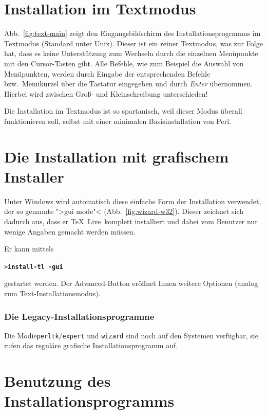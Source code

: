 \documentclass[12pt,ngerman,a4paper,fullparskip]{report}
\newcommand{\TL}{\TeX\ Live\xspace}
\newcommand{\Ucom}[1]{\textbf{\texttt{#1}}}
\begin{document}
\section{Installation im Textmodus}

Abb.~\ref{fig:text-main} zeigt den Eingangsbildschirm des Installationsprogramms im Textmodus (Standard unter Unix). Dieser ist ein reiner Textmodus, was zur Folge hat, dass es keine Unterstützung zum Wechseln durch die einzelnen Menüpunkte mit den Cursor-Tasten gibt. Alle Befehle, wie zum Beispiel die Auswahl von Menüpunkten, werden durch Eingabe der entsprechenden Befehle bzw.\ Menükürzel über die Tastatur eingegeben und durch \emph{Enter} übernommen. Hierbei wird zwischen Groß- und Kleinschreibung unterschieden!

Die Installation im Textmodus ist so spartanisch, weil dieser Modus überall funktionieren soll, selbst mit einer minimalen Basisinstallation von Perl.

\section{Die Installation mit grafischem Installer}

Unter Windows wird automatisch diese einfache Form der Installation verwendet,
der so genannte ">gui mode"< (Abb.~\ref{fig:wizard-w32}). Dieser zeichnet sich dadurch aus, dass er \TL\ komplett installiert und dabei vom Benutzer nur wenige Angaben gemacht werden müssen. 

Er kann mittels 

\begin{alltt}
> \Ucom{install-tl -gui}
\end{alltt}

gestartet werden.  Der Advanced-Button eröffnet Ihnen weitere Optionen (analog zum Text-Installationsmodus). %

\subsubsection{Die Legacy-Installationsprogramme}

Die Modie\texttt{perltk}/\texttt{expert} und \texttt{wizard} sind noch auf den Systemen verfügbar, sie rufen das reguläre grafische Installationsprogramm auf.

\section{Benutzung des Installationsprogramms}\label{sec:runinstall}
\end{document}
